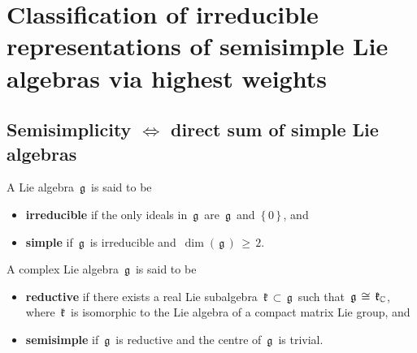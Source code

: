 

\chapter{Classification of irreducible representations of semisimple Lie algebras via highest weights}
\setcounter{theorem}{0}
\setcounter{equation}{0}


\renewcommand{\theenumi}{\roman{enumi}}
\renewcommand{\labelenumi}{\textnormal{(\theenumi)}$\;\;$}


\section{Semisimplicity $\Longleftrightarrow$ direct sum of simple Lie algebras}


\vskip 0.5cm
\begin{definition}
\mbox{}
\vskip 0.1cm
\noindent
A Lie algebra \,$\mathfrak{g}$\, is said to be
\begin{itemize}
\item
    \textbf{irreducible} if the only ideals in \,$\mathfrak{g}$\,
    are \,$\mathfrak{g}$\, and \,$\{\,0\,\}$\,, and
\item
    \textbf{simple} if \,$\mathfrak{g}$\, is irreducible and
    \,{\color{red}$\dim(\,\mathfrak{g}\,) \,\geq\, 2$}.\,
\end{itemize}
\end{definition}


\begin{definition}
\mbox{}
\vskip 0.1cm
\noindent
A complex Lie algebra \,$\mathfrak{g}$\, is said to be
\begin{itemize}
\item
    \textbf{reductive} if there exists a real Lie subalgebra
    \,$\mathfrak{k} \,\subset\, \mathfrak{g}$\,
    such that
    \,$\mathfrak{g} \,\cong\, \mathfrak{k}_{\mathbb{C}}$,\,
    where \,$\mathfrak{k}$\, is isomorphic
    to the Lie algebra of a {\color{red}compact} matrix Lie group, and
\item
    \textbf{semisimple} if \,$\mathfrak{g}$\, is reductive and
    the centre of \,$\mathfrak{g}$\, is trivial.
\end{itemize}
\end{definition}

